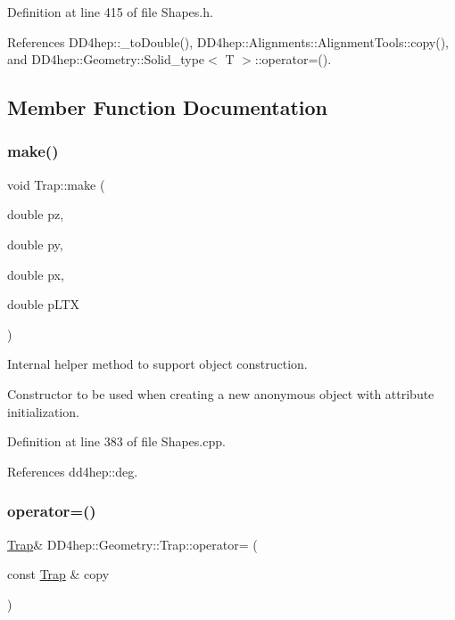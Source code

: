 Definition at line 415 of file Shapes.\+h.



References D\+D4hep\+::\+\_\+to\+Double(), D\+D4hep\+::\+Alignments\+::\+Alignment\+Tools\+::copy(), and D\+D4hep\+::\+Geometry\+::\+Solid\+\_\+type$<$ T $>$\+::operator=().



\subsection{Member Function Documentation}
\hypertarget{class_d_d4hep_1_1_geometry_1_1_trap_a2dcf7eee64e3128d22a35d1b1f872cf9}{}\label{class_d_d4hep_1_1_geometry_1_1_trap_a2dcf7eee64e3128d22a35d1b1f872cf9} 
\subsubsection{\texorpdfstring{make()}{make()}}
{\footnotesize\ttfamily void Trap\+::make (\begin{DoxyParamCaption}\item[{double}]{pz,  }\item[{double}]{py,  }\item[{double}]{px,  }\item[{double}]{p\+L\+TX }\end{DoxyParamCaption})\hspace{0.3cm}{\ttfamily [private]}}



Internal helper method to support object construction. 

Constructor to be used when creating a new anonymous object with attribute initialization. 

Definition at line 383 of file Shapes.\+cpp.



References dd4hep\+::deg.

\hypertarget{class_d_d4hep_1_1_geometry_1_1_trap_a82d15e0eeeda4326ca9a2a0c95b06761}{}\label{class_d_d4hep_1_1_geometry_1_1_trap_a82d15e0eeeda4326ca9a2a0c95b06761} 
\subsubsection{\texorpdfstring{operator=()}{operator=()}}
{\footnotesize\ttfamily \hyperlink{class_d_d4hep_1_1_geometry_1_1_trap}{Trap}\& D\+D4hep\+::\+Geometry\+::\+Trap\+::operator= (\begin{DoxyParamCaption}\item[{const \hyperlink{class_d_d4hep_1_1_geometry_1_1_trap}{Trap} \&}]{copy }\end{DoxyParamCaption})\hspace{0.3cm}{\ttfamily [default]}}



